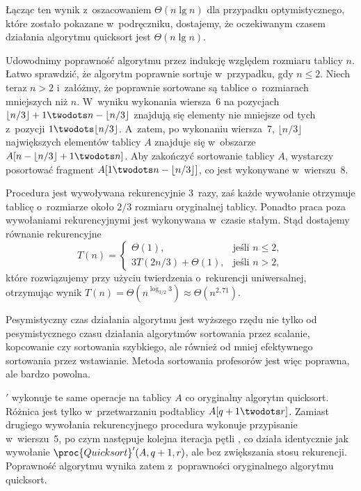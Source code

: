 Łącząc ten wynik z~oszacowaniem $\Theta(n\lg n)$ dla przypadku optymistycznego, które zostało pokazane w~podręczniku, dostajemy, że oczekiwanym czasem działania algorytmu quicksort jest $\Theta(n\lg n)$.


\subproblem %
Udowodnimy poprawność algorytmu przez indukcję względem rozmiaru tablicy $n$. Łatwo sprawdzić, że algorytm poprawnie sortuje w~przypadku, gdy $n\le2$. Niech teraz $n>2$ i~załóżmy, że poprawnie sortowane są tablice o~rozmiarach mniejszych niż $n$. W~wyniku wykonania wiersza~6 na pozycjach $\lfloor n/3\rfloor+1\twodots n-\lfloor n/3\rfloor$ znajdują się elementy nie mniejsze od tych z~pozycji $1\twodots\lfloor n/3\rfloor$. A~zatem, po wykonaniu wiersza~7, $\lfloor n/3\rfloor$ największych elementów tablicy $A$ znajduje się w~obszarze $A[n-\lfloor n/3\rfloor+1\twodots n]$. Aby zakończyć sortowanie tablicy $A$, wystarczy posortować fragment $A[1\twodots n-\lfloor n/3\rfloor]$, co jest wykonywane w~wierszu~8.

\subproblem %
Procedura jest wywoływana rekurencyjnie 3~razy, zaś każde wywołanie otrzymuje tablicę o~rozmiarze około $2/3$ rozmiaru oryginalnej tablicy. Ponadto praca poza wywołaniami rekurencyjnymi jest wykonywana w~czasie stałym. Stąd dostajemy równanie rekurencyjne
\[
	T(n) =
	\begin{cases}
		\Theta(1), & \text{jeśli $n\le2$}, \\
		3T(2n/3)+\Theta(1), & \text{jeśli $n>2$},
	\end{cases}
\]
które rozwiązujemy przy użyciu twierdzenia o~rekurencji uniwersalnej, otrzymując wynik $T(n)=\Theta(n^{\log_{3/2}3})\approx \Theta(n^{2{,}71})$.

\subproblem %
Pesymistyczny czas działania algorytmu  jest wyższego rzędu nie tylko od pesymistycznego czasu działania algorytmów sortowania przez scalanie, kopcowanie czy sortowania szybkiego, ale również od mniej efektywnego sortowania przez wstawianie. Metoda sortowania profesorów jest więc poprawna, ale bardzo powolna.


\subproblem %
$'$ wykonuje te same operacje na tablicy $A$ co oryginalny algorytm quicksort. Różnica jest tylko w~przetwarzaniu podtablicy $A[q+1\twodots r]$. Zamiast drugiego wywołania rekurencyjnego procedura wykonuje przypisanie w~wierszu~5, po czym następuje kolejna iteracja pętli , co działa identycznie jak wywołanie $\proc{Quicksort}'(A,q+1,r)$, ale bez zwiększania stosu rekurencji. Poprawność algorytmu wynika zatem z~poprawności oryginalnego algorytmu quicksort.

